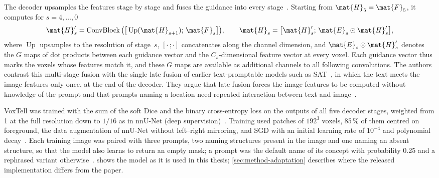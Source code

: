 The decoder upsamples the features stage by stage and fuses the guidance into every stage~\cite[Eqs.~4--6]{rokuss2025voxtellfreetextpromptableuniversal}.
Starting from $\mat{H}_5 = \mat{F}_5$, it computes for $s = 4, \dots, 0$
\begin{equation}
\mat{H}'_s = \operatorname{ConvBlock}\big(\big[\operatorname{Up}(\mat{H}_{s+1});\, \mat{F}_s\big]\big),
\qquad
\mat{H}_s = \big[\mat{H}'_s;\, \mat{E}_s \odot \mat{H}'_s\big],
\label{eq:bg-voxtell-fusion}
\end{equation}
where $\operatorname{Up}$ upsamples to the resolution of stage~$s$, $[\cdot\,;\cdot]$ concatenates along the channel dimension, and $\mat{E}_s \odot \mat{H}'_s$ denotes the $G$ maps of dot products between each guidance vector and the $C_s$-dimensional feature vector at every voxel.
Each guidance vector thus marks the voxels whose features match it, and these $G$ maps are available as additional channels to all following convolutions.
The authors contrast this multi-stage fusion with the single late fusion of earlier text-promptable models such as SAT~\cite{zhao2025sat}, in which the text meets the image features only once, at the end of the decoder.
They argue that late fusion forces the image features to be computed without knowledge of the prompt and that prompts naming a location need repeated interaction between text and image~\cite[p.~4]{rokuss2025voxtellfreetextpromptableuniversal}.

VoxTell was trained with the sum of the soft Dice and the binary cross-entropy loss on the outputs of all five decoder stages, weighted from 1 at the full resolution down to $1/16$ as in nnU-Net (deep supervision)~\cite[Eq.~7, S-p.~1]{rokuss2025voxtellfreetextpromptableuniversal}.
Training used patches of $192^3$ voxels, 85\,\% of them centred on foreground, the data augmentation of nnU-Net without left--right mirroring, and SGD with an initial learning rate of $10^{-4}$ and polynomial decay~\cite[S-p.~1]{rokuss2025voxtellfreetextpromptableuniversal}.
Each training image was paired with three prompts, two naming structures present in the image and one naming an absent structure, so that the model also learns to return an empty mask; a prompt was the default name of its concept with probability 0.25 and a rephrased variant otherwise~\cite[S-p.~1]{rokuss2025voxtellfreetextpromptableuniversal}.
 shows the model as it is used in this thesis; \cref{sec:method-adaptation} describes where the released implementation differs from the paper.

